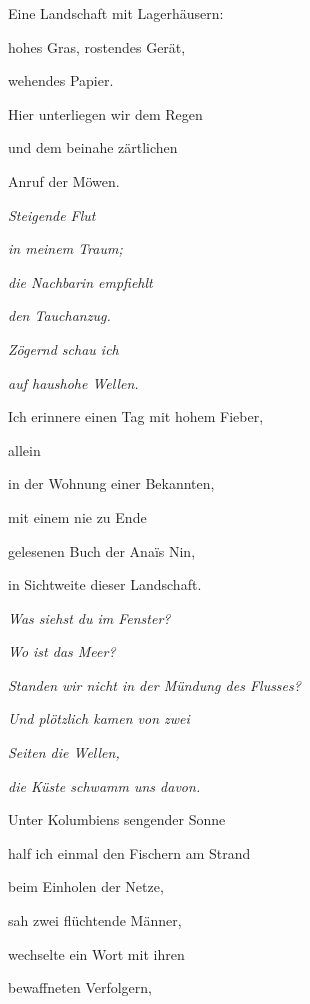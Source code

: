 

\bigskip

Eine Landschaft mit Lagerhäusern:

hohes Gras, rostendes Gerät,

wehendes Papier.


\bigskip

Hier unterliegen wir dem Regen

und dem beinahe zärtlichen

Anruf der Möwen.


\bigskip

\emph{
Steigende Flut}

\emph{
in meinem Traum;}

\emph{
die Nachbarin empfiehlt }

\emph{
den Tauchanzug.}

\emph{
Zögernd schau ich }

\emph{
auf haushohe Wellen.}


\bigskip

Ich erinnere einen Tag mit hohem Fieber, 

allein

in der Wohnung einer Bekannten,


\bigskip

mit einem nie zu Ende

gelesenen Buch der Anaïs Nin,

in Sichtweite dieser Landschaft.


\bigskip

\emph{
Was siehst du im Fenster?}

\emph{
Wo ist das Meer?}

\emph{
Standen wir nicht in der Mündung des Flusses?}

\emph{
Und plötzlich kamen von zwei}

\emph{
Seiten die Wellen,}

\emph{
die Küste schwamm uns davon.}


\bigskip

Unter Kolumbiens sengender Sonne

half ich einmal den Fischern am Strand

beim Einholen der Netze,


\bigskip

sah zwei flüchtende Männer,

wechselte ein Wort mit ihren 

bewaffneten Verfolgern,


\bigskip

